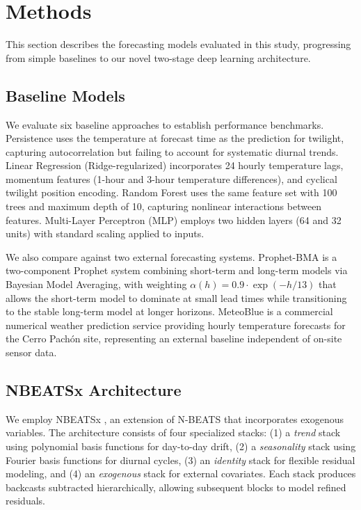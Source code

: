 \documentclass[twocolumn]{aastex631}
\begin{document}
\section{Methods}\label{sec:methods}

This section describes the forecasting models evaluated in this study, progressing from simple baselines to our novel two-stage deep learning architecture.

\subsection{Baseline Models}

We evaluate six baseline approaches to establish performance benchmarks. Persistence uses the temperature at forecast time as the prediction for twilight, capturing autocorrelation but failing to account for systematic diurnal trends. Linear Regression (Ridge-regularized) incorporates 24 hourly temperature lags, momentum features (1-hour and 3-hour temperature differences), and cyclical twilight position encoding. Random Forest uses the same feature set with 100 trees and maximum depth of 10, capturing nonlinear interactions between features. Multi-Layer Perceptron (MLP) employs two hidden layers (64 and 32 units) with standard scaling applied to inputs.

We also compare against two external forecasting systems. Prophet-BMA is a two-component Prophet system combining short-term and long-term models via Bayesian Model Averaging, with weighting $\alpha(h) = 0.9 \cdot \exp(-h/13)$ that allows the short-term model to dominate at small lead times while transitioning to the stable long-term model at longer horizons. MeteoBlue is a commercial numerical weather prediction service providing hourly temperature forecasts for the Cerro Pach\'on site, representing an external baseline independent of on-site sensor data.

\subsection{NBEATSx Architecture}

We employ NBEATSx \citep{Olivares2021}, an extension of N-BEATS \citep{Oreshkin2019} that incorporates exogenous variables. The architecture consists of four specialized stacks: (1) a \emph{trend} stack using polynomial basis functions for day-to-day drift, (2) a \emph{seasonality} stack using Fourier basis functions for diurnal cycles, (3) an \emph{identity} stack for flexible residual modeling, and (4) an \emph{exogenous} stack for external covariates. Each stack produces backcasts subtracted hierarchically, allowing subsequent blocks to model refined residuals.
\end{document}
